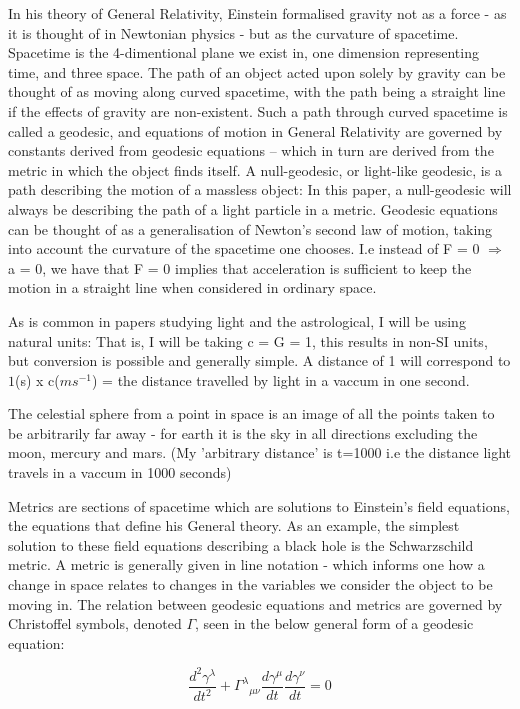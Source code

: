 \documentclass[oneside,openright,frontopenright]{dmathesis}
\begin{document}
	In his theory of General Relativity, Einstein formalised gravity not as a force - as it is thought of in Newtonian physics - but as the curvature of spacetime. Spacetime is the 4-dimentional plane we exist in, one dimension representing time, and three space. The path of an object acted upon solely by gravity can be thought of as moving along curved spacetime, with the path being a straight line if the effects of gravity are non-existent. Such a path through curved spacetime is called a geodesic, and equations of motion in General Relativity are governed by constants derived from geodesic equations – which in turn are derived from the metric in which the object finds itself. A null-geodesic, or light-like geodesic, is a path describing the motion of a massless object: In this paper, a null-geodesic will always be describing the path of a light particle in a metric. Geodesic equations can be thought of as a generalisation of Newton's second law of motion, taking into account the curvature of the spacetime one chooses. I.e instead of F = 0 $\Rightarrow$ a = 0, we have that F = 0 implies that acceleration is sufficient to keep the motion in a straight line when considered in ordinary space.

	As is common in papers studying light and the astrological, I will be using natural units: That is, I will be taking c = G = 1, this results in non-SI units, but conversion is possible and generally simple. A distance of 1 will correspond to $1$(s) x c($ms^{-1}$) = the distance travelled by light in a vaccum in one second.

	The celestial sphere from a point in space is an image of all the points taken to be arbitrarily far away - for earth it is the sky in all directions excluding the moon, mercury and mars. (My 'arbitrary distance' is t=1000 i.e the distance light travels in a vaccum in 1000 seconds)

	Metrics are sections of spacetime which are solutions to Einstein’s field equations, the equations that define his General theory. As an example, the simplest solution to these field equations describing a black hole is the Schwarzschild metric. A metric is generally given in line notation - which informs one how a change in space relates to changes in the variables we consider the object to be moving in. The relation between geodesic equations and metrics are governed by Christoffel symbols, denoted $\Gamma$, seen in the below general form of a geodesic equation\cite{geodesic}:  


	\[\frac{d^2 \gamma^\lambda}{dt^2} + {\Gamma^\lambda}_{\mu\nu} \frac{d\gamma^\mu}{dt} \frac{d\gamma^\nu}{dt} = 0\]
\end{document}
